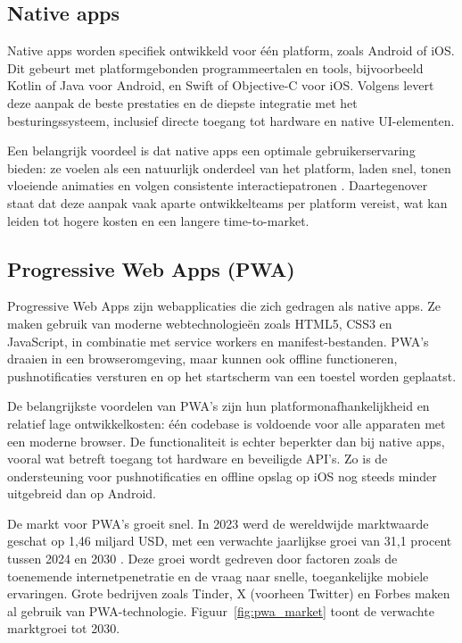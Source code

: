 \subsection{Native apps}
Native apps worden specifiek ontwikkeld voor één platform, zoals Android of iOS. Dit gebeurt met platformgebonden programmeertalen en tools, bijvoorbeeld Kotlin of Java voor Android, en Swift of Objective-C voor iOS. Volgens \textcite{Gillis} levert deze aanpak de beste prestaties en de diepste integratie met het besturingssysteem, inclusief directe toegang tot hardware en native UI-elementen.

Een belangrijk voordeel is dat native apps een optimale gebruikerservaring bieden: ze voelen als een natuurlijk onderdeel van het platform, laden snel, tonen vloeiende animaties en volgen consistente interactiepatronen \textcite{Gillis}. Daartegenover staat dat deze aanpak vaak aparte ontwikkelteams per platform vereist, wat kan leiden tot hogere kosten en een langere time-to-market.

\subsection{Progressive Web Apps (PWA)}
Progressive Web Apps zijn webapplicaties die zich gedragen als native apps. Ze maken gebruik van moderne webtechnologieën zoals HTML5, CSS3 en JavaScript, in combinatie met service workers en manifest-bestanden. PWA’s draaien in een browseromgeving, maar kunnen ook offline functioneren, pushnotificaties versturen en op het startscherm van een toestel worden geplaatst.

De belangrijkste voordelen van PWA’s zijn hun platformonafhankelijkheid en relatief lage ontwikkelkosten: één codebase is voldoende voor alle apparaten met een moderne browser. De functionaliteit is echter beperkter dan bij native apps, vooral wat betreft toegang tot hardware en beveiligde API’s. Zo is de ondersteuning voor pushnotificaties en offline opslag op iOS nog steeds minder uitgebreid dan op Android.

De markt voor PWA’s groeit snel. In 2023 werd de wereldwijde marktwaarde geschat op 1,46 miljard USD, met een verwachte jaarlijkse groei van 31,1 procent tussen 2024 en 2030 \autocite{Research2024}. Deze groei wordt gedreven door factoren zoals de toenemende internetpenetratie en de vraag naar snelle, toegankelijke mobiele ervaringen. Grote bedrijven zoals Tinder, X (voorheen Twitter) en Forbes maken al gebruik van PWA-technologie. Figuur~\ref{fig:pwa_market} toont de verwachte marktgroei tot 2030.

